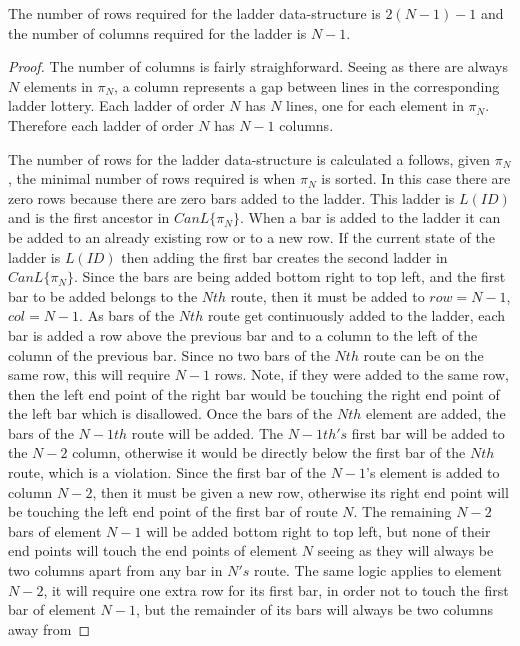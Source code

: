 \begin{theorem}
  The number of rows required for the ladder data-structure is $2(N-1) - 1$ and the number of columns required for 
  the ladder is $N-1$.
\end{theorem}
\begin{proof}
  The number of columns is fairly straighforward. Seeing as there are always $N$ elements in $\pi_{N}$, 
  a column represents a gap between lines in the corresponding ladder lottery. Each ladder of order $N$ has $N$ lines, 
  one for each element in $\pi_{N}$. Therefore each ladder of order $N$ has $N-1$ columns.\par 
  The number of rows for the ladder data-structure is calculated a follows, given $\pi_{N}$, the minimal 
  number of rows required is when $\pi_{N}$ is sorted. In this case there are zero rows because there are 
  zero bars added to the ladder. This ladder is $L(ID)$ and is 
  the first ancestor in $CanL\{\pi_{N}\}$. When a bar is added to the ladder it can be added to an already existing row 
  or to a new row. If the current state of the ladder is $L(ID)$ then adding the first bar creates the second ladder in
  $CanL\{\pi_{N}\}$. Since the bars are being added bottom right to top left, and the first bar to be added belongs 
  to the $Nth$ route, then it must be added to $row=N-1$, $col=N-1$. As bars of the $Nth$ route get 
  continuously added to the ladder, each bar is added a row above the previous bar and to a column 
  to the left of the column of the previous bar.
  Since no two bars of the $Nth$ route can be on the same row, this will require $N-1$ rows. Note, if they were added to the same 
  row, then the left end point of the right bar would be touching the right end point of the left bar which is disallowed. Once the 
  bars of the $Nth$ element are added, the bars of the $N-1th$ route will be added. The $N-1th's$ first bar 
  will be added to the $N-2$ column, otherwise it would be directly below the first bar of the $Nth$ route, which is a violation. 
  Since the first bar of the $N-1$'s element is added to column $N-2$, then it must be given a new row, otherwise its right end point 
  will be touching  the left end point of the first bar of route $N$. The remaining $N-2$ bars of element $N-1$
  will be added bottom right to top left, but none of their end points will touch the end points of element $N$ seeing as they will 
  always be two columns apart from any bar in $N's$ route. The same logic applies to element $N-2$, it will require one extra row for its 
  first bar, in order not to touch the first bar of element $N-1$, but the remainder of its bars will always be two columns away from 

\end{proof}
